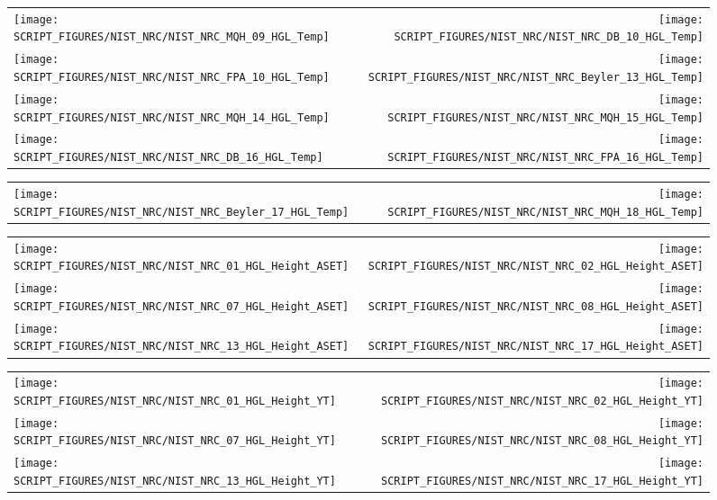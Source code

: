 \begin{figure}[!ht]
\begin{tabular*}{\textwidth}{l@{\extracolsep{\fill}}r}
\texttt{[image: SCRIPT\_FIGURES/NIST\_NRC/NIST\_NRC\_MQH\_09\_HGL\_Temp]} &
\texttt{[image: SCRIPT\_FIGURES/NIST\_NRC/NIST\_NRC\_DB\_10\_HGL\_Temp]} \\
\texttt{[image: SCRIPT\_FIGURES/NIST\_NRC/NIST\_NRC\_FPA\_10\_HGL\_Temp]} &
\texttt{[image: SCRIPT\_FIGURES/NIST\_NRC/NIST\_NRC\_Beyler\_13\_HGL\_Temp]} \\
\texttt{[image: SCRIPT\_FIGURES/NIST\_NRC/NIST\_NRC\_MQH\_14\_HGL\_Temp]} &
\texttt{[image: SCRIPT\_FIGURES/NIST\_NRC/NIST\_NRC\_MQH\_15\_HGL\_Temp]} \\
\texttt{[image: SCRIPT\_FIGURES/NIST\_NRC/NIST\_NRC\_DB\_16\_HGL\_Temp]} &
\texttt{[image: SCRIPT\_FIGURES/NIST\_NRC/NIST\_NRC\_FPA\_16\_HGL\_Temp]}
\end{tabular*}
\end{figure}

\begin{figure}[!ht]
\begin{tabular*}{\textwidth}{l@{\extracolsep{\fill}}r}
\texttt{[image: SCRIPT\_FIGURES/NIST\_NRC/NIST\_NRC\_Beyler\_17\_HGL\_Temp]} &
\texttt{[image: SCRIPT\_FIGURES/NIST\_NRC/NIST\_NRC\_MQH\_18\_HGL\_Temp]}
\end{tabular*}
\end{figure}

\begin{figure}[!ht]
\begin{tabular*}{\textwidth}{l@{\extracolsep{\fill}}r}
\texttt{[image: SCRIPT\_FIGURES/NIST\_NRC/NIST\_NRC\_01\_HGL\_Height\_ASET]} &
\texttt{[image: SCRIPT\_FIGURES/NIST\_NRC/NIST\_NRC\_02\_HGL\_Height\_ASET]} \\
\texttt{[image: SCRIPT\_FIGURES/NIST\_NRC/NIST\_NRC\_07\_HGL\_Height\_ASET]} &
\texttt{[image: SCRIPT\_FIGURES/NIST\_NRC/NIST\_NRC\_08\_HGL\_Height\_ASET]} \\
\texttt{[image: SCRIPT\_FIGURES/NIST\_NRC/NIST\_NRC\_13\_HGL\_Height\_ASET]} &
\texttt{[image: SCRIPT\_FIGURES/NIST\_NRC/NIST\_NRC\_17\_HGL\_Height\_ASET]}
\end{tabular*}
\end{figure}

\begin{figure}[!ht]
\begin{tabular*}{\textwidth}{l@{\extracolsep{\fill}}r}
\texttt{[image: SCRIPT\_FIGURES/NIST\_NRC/NIST\_NRC\_01\_HGL\_Height\_YT]} &
\texttt{[image: SCRIPT\_FIGURES/NIST\_NRC/NIST\_NRC\_02\_HGL\_Height\_YT]} \\
\texttt{[image: SCRIPT\_FIGURES/NIST\_NRC/NIST\_NRC\_07\_HGL\_Height\_YT]} &
\texttt{[image: SCRIPT\_FIGURES/NIST\_NRC/NIST\_NRC\_08\_HGL\_Height\_YT]} \\
\texttt{[image: SCRIPT\_FIGURES/NIST\_NRC/NIST\_NRC\_13\_HGL\_Height\_YT]} &
\texttt{[image: SCRIPT\_FIGURES/NIST\_NRC/NIST\_NRC\_17\_HGL\_Height\_YT]}
\end{tabular*}
\end{figure}

